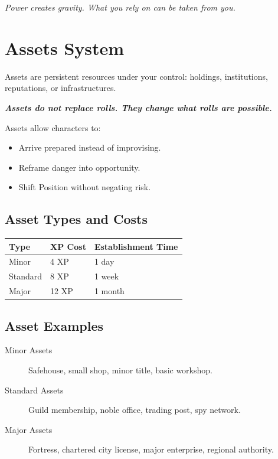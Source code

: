 \emph{Power creates gravity. What you rely on can be taken from you.}

\section{Assets System}
\label{sec:assets-system}

Assets are persistent resources under your control: holdings, institutions, reputations, or infrastructures.

\textit{\textbf{Assets do not replace rolls. They change what rolls are possible.}}

Assets allow characters to:
\begin{itemize}
\item Arrive prepared instead of improvising.
\item Reframe danger into opportunity.
\item Shift Position without negating risk.
\end{itemize}

\subsection*{Asset Types and Costs}
\label{sec:asset-types-costs}
\begin{center}
\begin{tabular}{lll}
\toprule
\textbf{Type} & \textbf{XP Cost} & \textbf{Establishment Time} \\
\midrule
Minor    & 4 XP  & 1 day \\
Standard & 8 XP  & 1 week \\
Major    & 12 XP & 1 month \\
\bottomrule
\end{tabular}
\end{center}

\subsection*{Asset Examples}
\label{sec:asset-examples}
\begin{description}
\item[Minor Assets] Safehouse, small shop, minor title, basic workshop.
\item[Standard Assets] Guild membership, noble office, trading post, spy network.
\item[Major Assets] Fortress, chartered city license, major enterprise, regional authority.
\end{description}

